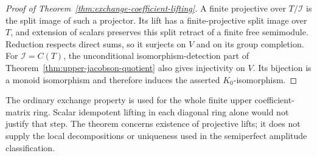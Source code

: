 \begin{proof}[Proof of Theorem~\ref{thm:exchange-coefficient-lifting}]
A finite projective over $T/\mathcal I$ is the split image
of such a projector. Its lift has a finite-projective split
image over $T$, and extension of scalars preserves this split
retract of a finite free semimodule. Reduction respects direct
sums, so it surjects on $V$ and on its group completion.
For $\mathcal I=C(T)$, the unconditional isomorphism-detection
part of Theorem~\ref{thm:upper-jacobson-quotient} also gives
injectivity on $V$. Its bijection is a monoid isomorphism and
therefore induces the asserted $K_0$-isomorphism.
\end{proof}

The ordinary exchange property is used for the whole finite
upper coefficient-matrix ring. Scalar idempotent lifting in
each diagonal ring alone would not justify that step. The
theorem concerns existence of projective lifts; it does not
supply the local decompositions or uniqueness used in the
semiperfect amplitude classification.

